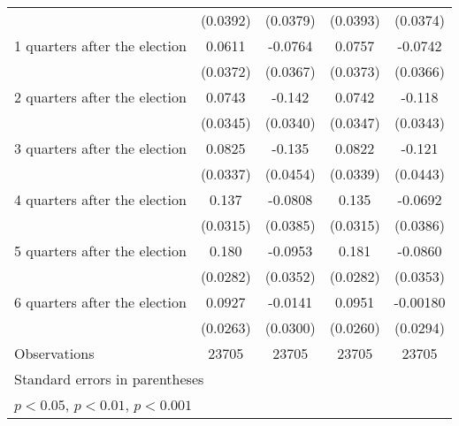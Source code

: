 \begin{table}[htbp]
\begin{tabular}{l*{4}{c}}
                    &    (0.0392)         &    (0.0379)         &    (0.0393)         &    (0.0374)         \\
[1em]
 1 quarters after the election&      0.0611         &     -0.0764\sym{*}  &      0.0757\sym{*}  &     -0.0742\sym{*}  \\
                    &    (0.0372)         &    (0.0367)         &    (0.0373)         &    (0.0366)         \\
[1em]
 2 quarters after the election&      0.0743\sym{*}  &      -0.142\sym{***}&      0.0742\sym{*}  &      -0.118\sym{***}\\
                    &    (0.0345)         &    (0.0340)         &    (0.0347)         &    (0.0343)         \\
[1em]
 3 quarters after the election&      0.0825\sym{*}  &      -0.135\sym{**} &      0.0822\sym{*}  &      -0.121\sym{**} \\
                    &    (0.0337)         &    (0.0454)         &    (0.0339)         &    (0.0443)         \\
[1em]
 4 quarters after the election&       0.137\sym{***}&     -0.0808\sym{*}  &       0.135\sym{***}&     -0.0692         \\
                    &    (0.0315)         &    (0.0385)         &    (0.0315)         &    (0.0386)         \\
[1em]
 5 quarters after the election&       0.180\sym{***}&     -0.0953\sym{**} &       0.181\sym{***}&     -0.0860\sym{*}  \\
                    &    (0.0282)         &    (0.0352)         &    (0.0282)         &    (0.0353)         \\
[1em]
 6 quarters after the election&      0.0927\sym{***}&     -0.0141         &      0.0951\sym{***}&    -0.00180         \\
                    &    (0.0263)         &    (0.0300)         &    (0.0260)         &    (0.0294)         \\
\hline
Observations        &       23705         &       23705         &       23705         &       23705         \\
\hline\hline
\multicolumn{5}{l}{\footnotesize Standard errors in parentheses}\\
\multicolumn{5}{l}{\footnotesize \sym{*} \(p<0.05\), \sym{**} \(p<0.01\), \sym{***} \(p<0.001\)}\\
\end{tabular}
\end{table}
